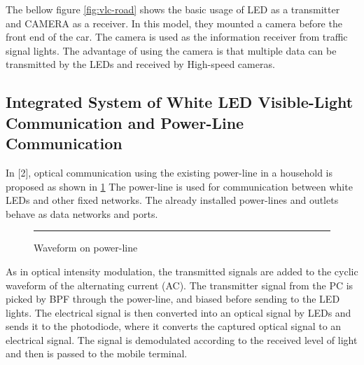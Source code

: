 The bellow figure \ref{fig:vlc-road} shows the basic usage of LED as a transmitter and CAMERA as a
receiver. In this model, they mounted a camera before the front end of the car. The
camera is used as the information receiver from traffic signal lights. The advantage of
using the camera is that multiple data can be transmitted by the LEDs and received by
High-speed cameras. 


\subsection{Integrated System of White LED Visible-Light Communication and Power-Line Communication}

In [2], optical communication using the existing power-line in a household is proposed as
shown in \ref{fig:vlc-powerline}
The power-line is used for communication between white LEDs and other fixed
networks. The already installed power-lines and outlets behave as data networks and
ports.

\begin{figure}[htbp]
  \centering
    \rule{35em}{0.5pt}
  \caption[Waveform on power-line]{Waveform on power-line}
  \label{fig:vlc-powerline}
\end{figure}

As in optical intensity modulation, the transmitted signals are added to the cyclic
waveform of the alternating current (AC). The transmitter signal from the PC is picked
by BPF through the power-line, and biased before sending to the LED lights. The
electrical signal is then converted into an optical signal by LEDs and sends it to the
photodiode, where it converts the captured optical signal to an electrical signal. The
signal is demodulated according to the received level of light and then is passed to the
mobile terminal.

